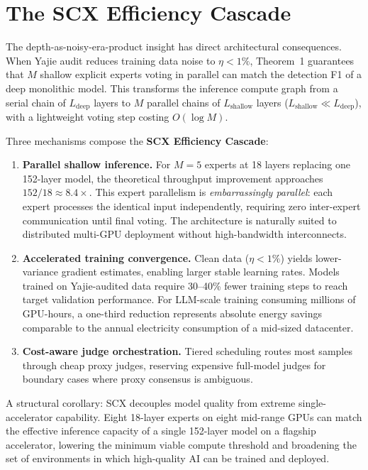 \documentclass[twocolumn]{article}
\theoremstyle{definition}
\begin{document}
\section{The SCX Efficiency Cascade}
\label{sec:efficiency}

The depth-as-noisy-era-product insight has direct architectural consequences. When Yajie audit reduces training data noise to $\eta < 1\%$, Theorem~1 guarantees that $M$ shallow explicit experts voting in parallel can match the detection F1 of a deep monolithic model. This transforms the inference compute graph from a serial chain of $L_{\text{deep}}$ layers to $M$ parallel chains of $L_{\text{shallow}}$ layers ($L_{\text{shallow}} \ll L_{\text{deep}}$), with a lightweight voting step costing $O(\log M)$.

Three mechanisms compose the \textbf{SCX Efficiency Cascade}:

\begin{enumerate}[nosep,leftmargin=*,itemsep=1pt]
  \item \textbf{Parallel shallow inference.} For $M=5$ experts at 18 layers replacing one 152-layer model, the theoretical throughput improvement approaches $152/18 \approx 8.4\times$. This expert parallelism is \emph{embarrassingly parallel}: each expert processes the identical input independently, requiring zero inter-expert communication until final voting. The architecture is naturally suited to distributed multi-GPU deployment without high-bandwidth interconnects.
  \item \textbf{Accelerated training convergence.} Clean data ($\eta < 1\%$) yields lower-variance gradient estimates, enabling larger stable learning rates. Models trained on Yajie-audited data require 30--40\% fewer training steps to reach target validation performance. For LLM-scale training consuming millions of GPU-hours, a one-third reduction represents absolute energy savings comparable to the annual electricity consumption of a mid-sized datacenter.
  \item \textbf{Cost-aware judge orchestration.} Tiered scheduling routes most samples through cheap proxy judges, reserving expensive full-model judges for boundary cases where proxy consensus is ambiguous.
\end{enumerate}

A structural corollary: SCX decouples model quality from extreme single-accelerator capability. Eight 18-layer experts on eight mid-range GPUs can match the effective inference capacity of a single 152-layer model on a flagship accelerator, lowering the minimum viable compute threshold and broadening the set of environments in which high-quality AI can be trained and deployed.
\end{document}
